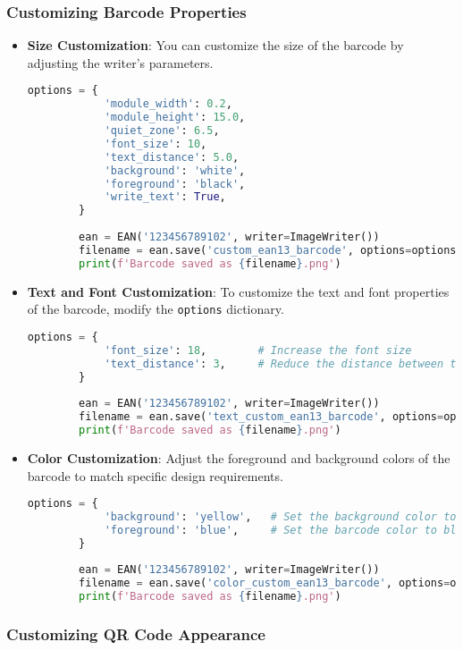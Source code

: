 \subsubsection{Customizing Barcode Properties}

\begin{itemize}
	\item \textbf{Size Customization}:
	You can customize the size of the barcode by adjusting the writer's parameters.
	\begin{lstlisting}[language=Python]
		options = {
			'module_width': 0.2,
			'module_height': 15.0,
			'quiet_zone': 6.5,
			'font_size': 10,
			'text_distance': 5.0,
			'background': 'white',
			'foreground': 'black',
			'write_text': True,
		}
		
		ean = EAN('123456789102', writer=ImageWriter())
		filename = ean.save('custom_ean13_barcode', options=options)
		print(f'Barcode saved as {filename}.png')
	\end{lstlisting}
	
	\item \textbf{Text and Font Customization}:
	To customize the text and font properties of the barcode, modify the \texttt{options} dictionary.
	\begin{lstlisting}[language=Python]
		options = {
			'font_size': 18,        # Increase the font size
			'text_distance': 3,     # Reduce the distance between the barcode and text
		}
		
		ean = EAN('123456789102', writer=ImageWriter())
		filename = ean.save('text_custom_ean13_barcode', options=options)
		print(f'Barcode saved as {filename}.png')
	\end{lstlisting}
	
	\item \textbf{Color Customization}:
	Adjust the foreground and background colors of the barcode to match specific design requirements.\cite{Oliverpython:2023}
	\begin{lstlisting}[language=Python]
		options = {
			'background': 'yellow',   # Set the background color to yellow
			'foreground': 'blue',     # Set the barcode color to blue
		}
		
		ean = EAN('123456789102', writer=ImageWriter())
		filename = ean.save('color_custom_ean13_barcode', options=options)
		print(f'Barcode saved as {filename}.png')
	\end{lstlisting}
\end{itemize}

\subsubsection{Customizing QR Code Appearance}

